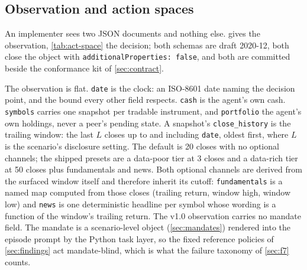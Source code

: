 \subsection{Observation and action spaces}\label{sec:spaces}

An implementer sees two JSON documents and nothing else.  gives the observation, \cref{tab:act-space} the decision; both schemas are draft 2020-12, both close the object with \texttt{additionalProperties: false}, and both are committed beside the conformance kit of \cref{sec:contract}.

The observation is flat. \texttt{date} is the clock: an ISO-8601 date naming the decision point, and the bound every other field respects. \texttt{cash} is the agent's own cash. \texttt{symbols} carries one snapshot per tradable instrument, and \texttt{portfolio} the agent's own holdings, never a peer's pending state. A snapshot's \texttt{close\_history} is the trailing window: the last $L$ closes up to and including \texttt{date}, oldest first, where $L$ is the scenario's disclosure setting. The default is 20 closes with no optional channels; the shipped presets are a data-poor tier at 3 closes and a data-rich tier at 50 closes plus fundamentals and news. Both optional channels are derived from the surfaced window itself and therefore inherit its cutoff: \texttt{fundamentals} is a named map computed from those closes (trailing return, window high, window low) and \texttt{news} is one deterministic headline per symbol whose wording is a function of the window's trailing return. The v1.0 observation carries no mandate field. The mandate is a scenario-level object (\cref{sec:mandates}) rendered into the episode prompt by the Python task layer, so the fixed reference policies of \cref{sec:findings} act mandate-blind, which is what the failure taxonomy of \cref{sec:f7} counts.


